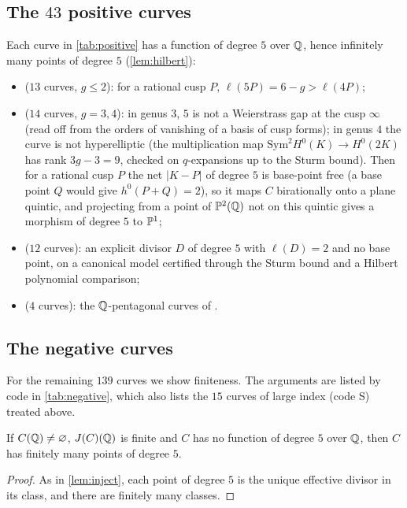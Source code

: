 \subsection{The \texorpdfstring{$43$}{43} positive curves}
Each curve in \cref{tab:positive} has a function of degree $5$ over $\mathbb{Q}$, hence infinitely many points of degree
$5$ (\cref{lem:hilbert}):
\begin{itemize}
\item[L] ($13$ curves, $g\le2$): for a rational cusp $P$, $\ell(5P)=6-g>\ell(4P)$;
\item[K] ($14$ curves, $g=3,4$): in genus $3$, $5$ is not a Weierstrass gap at the cusp $\infty$ (read off
 from the orders of vanishing of a basis of cusp forms); in genus $4$ the curve is not hyperelliptic (the
 multiplication map $\mathrm{Sym}^2H^0(K)\to H^0(2K)$ has rank $3g-3=9$, checked on $q$-expansions up to the
 Sturm bound). Then for a rational cusp $P$ the net $|K-P|$ of degree $5$ is base-point free (a base point $Q$
 would give $h^0(P+Q)=2$), so it maps $C$ birationally onto a plane quintic, and projecting from a point of
 $\mathbb{P}^2(\mathbb{Q})$ not on this quintic gives a morphism of degree $5$ to $\mathbb{P}^1$;
\item[W] ($12$ curves): an explicit divisor $D$ of degree $5$ with $\ell(D)=2$ and no base point, on a canonical
 model certified through the Sturm bound and a Hilbert polynomial comparison;
\item[P] ($4$ curves): the $\mathbb{Q}$-pentagonal curves of \cite[Theorems~1.4--1.5]{Orlic2025}.
\end{itemize}

\subsection{The negative curves}
For the remaining $139$ curves we show finiteness. The arguments are listed by code in \cref{tab:negative},
which also lists the $15$ curves of large index (code S) treated above.

\begin{lemma}\label{lem:rankzero}
If $C(\mathbb{Q})\ne\varnothing$, $J(C)(\mathbb{Q})$ is finite and $C$ has no function of degree $5$ over $\mathbb{Q}$, then $C$ has
finitely many points of degree $5$.
\end{lemma}
\begin{proof}
As in \cref{lem:inject}, each point of degree $5$ is the unique effective divisor in its class, and there are
finitely many classes.
\end{proof}


